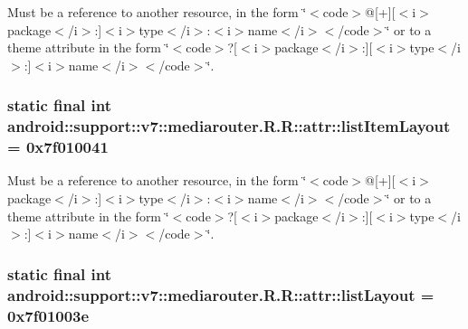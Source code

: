Must be a reference to another resource, in the form \char`\"{}$<$code$>$@\mbox{[}+\mbox{]}\mbox{[}$<$i$>$package$<$/i$>$:\mbox{]}$<$i$>$type$<$/i$>$:$<$i$>$name$<$/i$>$$<$/code$>$\char`\"{} or to a theme attribute in the form \char`\"{}$<$code$>$?\mbox{[}$<$i$>$package$<$/i$>$:\mbox{]}\mbox{[}$<$i$>$type$<$/i$>$:\mbox{]}$<$i$>$name$<$/i$>$$<$/code$>$\char`\"{}. \hypertarget{classandroid_1_1support_1_1v7_1_1mediarouter_1_1_r_1_1attr_d9a88357394fe76a15c6508fb1fee0ce}{
\subsubsection[{listItemLayout}]{\setlength{\rightskip}{0pt plus 5cm}static final int android::support::v7::mediarouter.R.R::attr::listItemLayout = 0x7f010041}}
\label{classandroid_1_1support_1_1v7_1_1mediarouter_1_1_r_1_1attr_d9a88357394fe76a15c6508fb1fee0ce}


Must be a reference to another resource, in the form \char`\"{}$<$code$>$@\mbox{[}+\mbox{]}\mbox{[}$<$i$>$package$<$/i$>$:\mbox{]}$<$i$>$type$<$/i$>$:$<$i$>$name$<$/i$>$$<$/code$>$\char`\"{} or to a theme attribute in the form \char`\"{}$<$code$>$?\mbox{[}$<$i$>$package$<$/i$>$:\mbox{]}\mbox{[}$<$i$>$type$<$/i$>$:\mbox{]}$<$i$>$name$<$/i$>$$<$/code$>$\char`\"{}. \hypertarget{classandroid_1_1support_1_1v7_1_1mediarouter_1_1_r_1_1attr_eacc532bb2e5f243945340bea92c5a51}{
\subsubsection[{listLayout}]{\setlength{\rightskip}{0pt plus 5cm}static final int android::support::v7::mediarouter.R.R::attr::listLayout = 0x7f01003e}}
\label{classandroid_1_1support_1_1v7_1_1mediarouter_1_1_r_1_1attr_eacc532bb2e5f243945340bea92c5a51}


